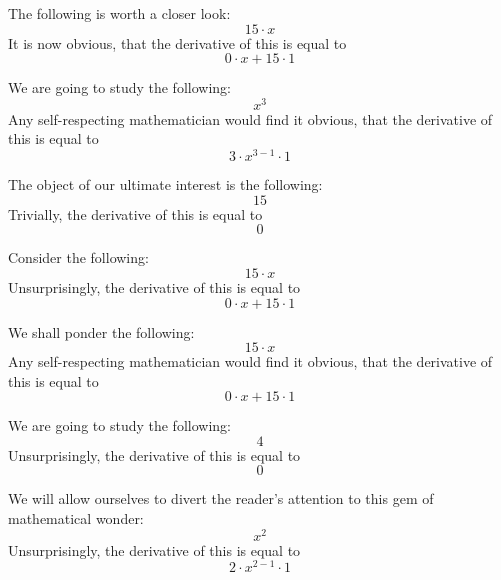 \documentclass{article}
\begin{document}
The following is worth a closer look:
\begin{equation}
15 \cdot x 
\end{equation}
It is now obvious, that the derivative of this is equal to
\begin{equation}
0 \cdot x + 15 \cdot 1 
\end{equation}

We are going to study the following:
\begin{equation}
x ^{3 } 
\end{equation}
Any self-respecting mathematician would find it obvious, that the derivative of this is equal to
\begin{equation}
3 \cdot x ^{3 - 1 } \cdot 1 
\end{equation}

The object of our ultimate interest is the following:
\begin{equation}
15 
\end{equation}
Trivially, the derivative of this is equal to
\begin{equation}
0 
\end{equation}

Consider the following:
\begin{equation}
15 \cdot x 
\end{equation}
Unsurprisingly, the derivative of this is equal to
\begin{equation}
0 \cdot x + 15 \cdot 1 
\end{equation}

We shall ponder the following:
\begin{equation}
15 \cdot x 
\end{equation}
Any self-respecting mathematician would find it obvious, that the derivative of this is equal to
\begin{equation}
0 \cdot x + 15 \cdot 1 
\end{equation}

We are going to study the following:
\begin{equation}
4 
\end{equation}
Unsurprisingly, the derivative of this is equal to
\begin{equation}
0 
\end{equation}

We will allow ourselves to divert the reader's attention to this gem of mathematical wonder:
\begin{equation}
x ^{2 } 
\end{equation}
Unsurprisingly, the derivative of this is equal to
\begin{equation}
2 \cdot x ^{2 - 1 } \cdot 1 
\end{equation}
\end{document}
